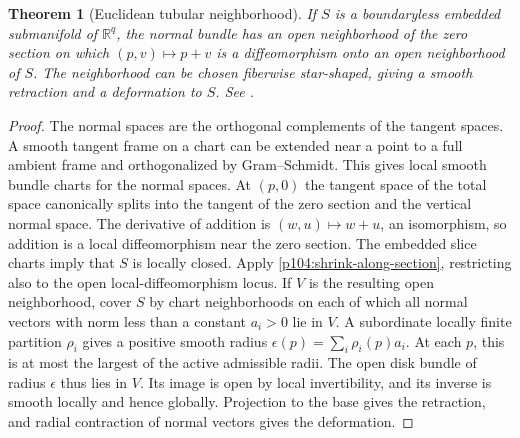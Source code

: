 \documentclass[11pt,oneside,openany]{book}
\newtheorem{theorem}{Theorem}[chapter]
\theoremstyle{definition}
\theoremstyle{remark}
\newcommand{\R}{\mathbb R}
\begin{document}
\begin{theorem}[Euclidean tubular neighborhood]\label{p104:M04.04}
If \(S\) is a boundaryless embedded submanifold of \(\R^q\), the normal bundle has an open neighborhood of the zero section on which \((p,v)\mapsto p+v\) is a diffeomorphism onto an open neighborhood of \(S\). The neighborhood can be chosen fiberwise star-shaped, giving a smooth retraction and a deformation to \(S\). See \cite[Theorem 6.24 and Proposition 6.25]{lee}.
\end{theorem}
\begin{proof}
The normal spaces are the orthogonal complements of the tangent spaces. A smooth tangent frame on a chart can be extended near a point to a full ambient frame and orthogonalized by Gram--Schmidt. This gives local smooth bundle charts for the normal spaces. At \((p,0)\) the tangent space of the total space canonically splits into the tangent of the zero section and the vertical normal space. The derivative of addition is \((w,u)\mapsto w+u\), an isomorphism, so addition is a local diffeomorphism near the zero section. The embedded slice charts imply that \(S\) is locally closed. Apply \cref{p104:shrink-along-section}, restricting also to the open local-diffeomorphism locus. If \(V\) is the resulting open neighborhood, cover \(S\) by chart neighborhoods on each of which all normal vectors with norm less than a constant \(a_i>0\) lie in \(V\). A subordinate locally finite partition \(\rho_i\) gives a positive smooth radius \(\epsilon(p)=\sum_i\rho_i(p)a_i\). At each \(p\), this is at most the largest of the active admissible radii. The open disk bundle of radius \(\epsilon\) thus lies in \(V\). Its image is open by local invertibility, and its inverse is smooth locally and hence globally. Projection to the base gives the retraction, and radial contraction of normal vectors gives the deformation.
\end{proof}
\end{document}
